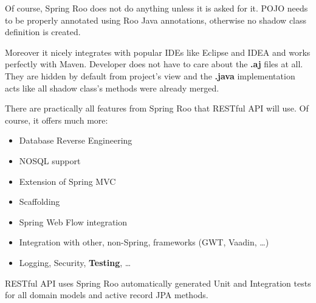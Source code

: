 	Of course, Spring Roo does not do anything unless it is asked for it. POJO needs to be properly annotated using Roo
	Java annotations, otherwise no shadow class definition is created.
	
	Moreover it nicely integrates with popular IDEs like Eclipse and IDEA and works perfectly with Maven. Developer does
	not have to care about the \textbf{.aj} files at all. They are hidden by default from project's view and the
	\textbf{.java} implementation acts like all shadow class's methods were already merged.
	
	There are practically all features from Spring Roo that RESTful API will use. Of course, it offers much more:
	
	\begin{itemize}
	  \item Database Reverse Engineering
	  \item NOSQL support
	  \item Extension of Spring MVC
	  \item Scaffolding
	  \item Spring Web Flow integration
	  \item Integration with other, non-Spring, frameworks (GWT, Vaadin, \ldots)
	  \item Logging, Security, \textbf{Testing}, \ldots
	\end{itemize}

	RESTful API uses Spring Roo automatically generated Unit and Integration tests for all domain models and active record
	JPA methods.
